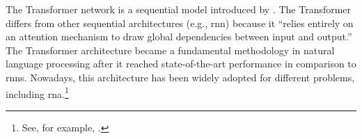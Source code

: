 

The Transformer network is a sequential model introduced by
\textcite{vaswani2017attention}. The Transformer differs
from other sequential architectures (e.g., \gls{rnn})
because it ``relies entirely on an attention mechanism to
draw global dependencies between input and output.'' The
Transformer architecture became a fundamental methodology in
natural language processing after it reached
state-of-the-art performance in comparison to \glspl{rnn}.
Nowadays, this architecture has been widely adopted for
different problems, including \gls{rna}.\footnote{See, for
example, \textcite{chen2021attend}.}
